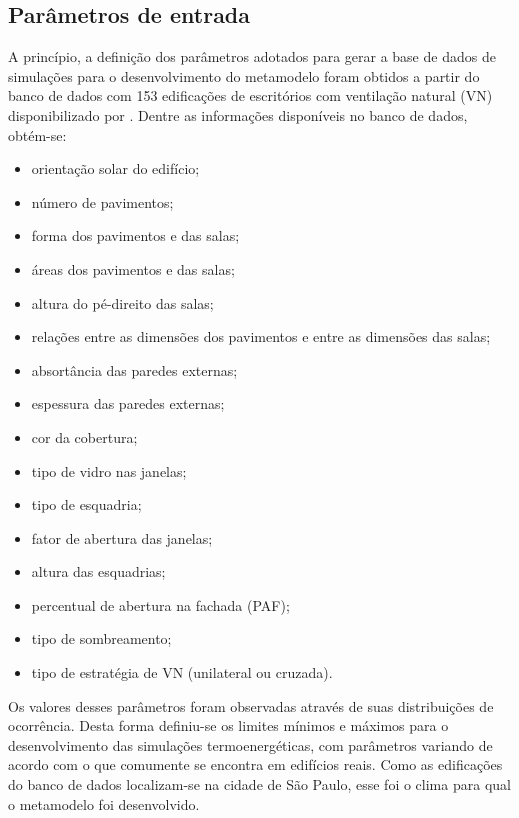 \documentclass[brazil,hardcopy,openany,a5paper]{ufscthesis}
\begin{document}
		\subsection{Parâmetros de entrada}
		
		A princípio, a definição dos parâmetros adotados para gerar a base de dados de simulações para o desenvolvimento do metamodelo foram obtidos a partir do banco de dados com 153 edificações de escritórios com ventilação natural (VN) disponibilizado por  \cite{Pereira2018}.  		
		Dentre as informações  disponíveis no banco de dados, obtém-se:
		
		\begin{itemize}
			\item orientação solar do edifício;
			\item número de pavimentos;
			\item forma dos pavimentos e das salas;
			\item áreas dos pavimentos e das salas;
			\item altura do pé-direito das salas;
			\item relações entre as dimensões dos pavimentos e entre as dimensões das salas;
			\item absortância das paredes externas; %
			\item espessura das paredes externas;
			\item cor da cobertura;
			\item tipo de vidro nas janelas;
			\item tipo de esquadria;
			\item fator de abertura das janelas;
			\item altura das esquadrias;
			\item percentual de abertura na fachada (PAF);  %
			\item tipo de sombreamento;  %
			\item tipo de estratégia de VN (unilateral ou cruzada).
		\end{itemize} 
		
		Os valores desses parâmetros foram observadas através de suas distribuições de ocorrência. Desta forma definiu-se os limites mínimos e máximos para o desenvolvimento das simulações termoenergéticas, com parâmetros variando de acordo com o que comumente se encontra em edifícios reais. Como as edificações do banco de dados localizam-se na cidade de São Paulo, esse foi o clima para qual o metamodelo foi desenvolvido.
		
\end{document}
